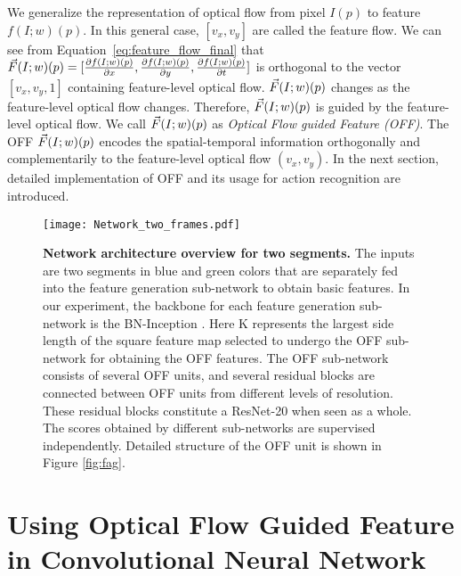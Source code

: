 \documentclass[10pt,twocolumn,letterpaper]{article}
\begin{document}
We generalize the representation of optical flow from pixel $I(p)$ to feature $ f(I;w)(p)$. In this general case, $[v_{x}, v_{y}]$ are called the feature flow.
We can see from Equation~\ref{eq:feature_flow_final} that $\vec{F}{\\}(I;w)(p)=[\frac{\partial f(I;w)(p)}{\partial x}, \frac{\partial f(I;w)(p)}{\partial y}, \frac{\partial f(I;w)(p)}{\partial t}]$ is orthogonal to the vector $[v_{x}, v_{y}, 1]$ containing feature-level optical flow. $\vec{F}{\\}(I;w)(p)$ changes as the feature-level optical flow changes. Therefore, $\vec{F}{\\}(I;w)(p)$ is guided by the feature-level optical flow. We call $\vec{F}{\\}(I;w)(p)$ as \textit{Optical Flow guided Feature (OFF)}. 
The OFF $\vec{F}{\\}(I;w)(p)$ encodes the spatial-temporal information orthogonally and complementarily to the feature-level optical flow $(v_{x}, v_{y})$.
In the next section, detailed implementation of OFF and its usage for action recognition are introduced. 




\begin{figure*}[t]
\centering
\texttt{[image: Network\_two\_frames.pdf]}
\caption{\textbf{Network architecture overview for two segments.} The inputs are two segments in blue and green colors that are separately fed into the feature generation sub-network to obtain basic features. In our experiment, the backbone for each feature generation sub-network is the BN-Inception \cite{Szegedycvpr2015googlenet}. Here K represents the largest side length of the square feature map selected to undergo the OFF sub-network for obtaining the OFF features. The OFF sub-network consists of several OFF units, and several residual blocks \cite{he2016resnet} are connected between OFF units from different levels of resolution. These residual blocks constitute a ResNet-20 when seen as a whole. The scores obtained by different sub-networks are supervised independently. Detailed structure of the OFF unit is shown in Figure \ref{fig:fag}.}
\label{fig:overview}
\end{figure*}

\section{Using Optical Flow Guided Feature in Convolutional Neural Network}
\label{sec:cnn}
\end{document}
